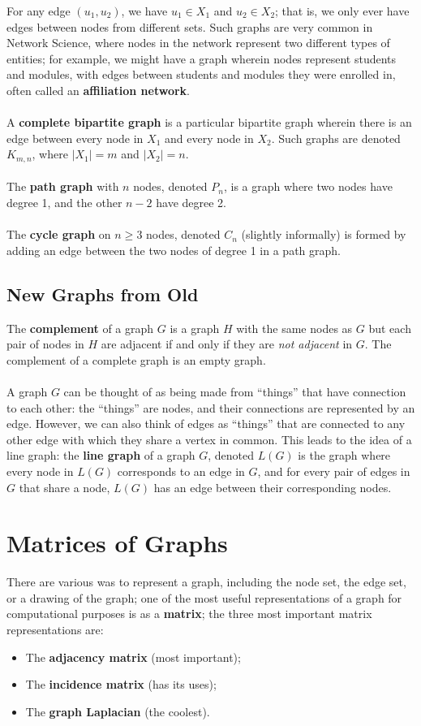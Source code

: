 \documentclass[a4paper,11pt]{article}
\begin{document}
For any edge $(u_1, u_2)$, we have $u_1 \in X_1$ and $u_2 \in X_2$; that is, we only ever have edges between nodes from different sets.
Such graphs are very common in Network Science, where nodes in the network represent two different types of entities; for example, we might have a graph wherein nodes represent students and modules, with edges between students and modules they were enrolled in, often called an \textbf{affiliation network}.
\\\\
A \textbf{complete bipartite graph} is a particular bipartite graph wherein there is an edge between every node in $X_1$ and every node in $X_2$.
Such graphs are denoted $K_{m,n}$, where $|X_1| = m$ and $|X_2|=n$.
\\\\
The \textbf{path graph} with $n$ nodes, denoted $P_n$, is a graph where two nodes have degree 1, and the other $n-2$ have degree 2.
\\\\
The \textbf{cycle graph} on $n \geq 3$ nodes, denoted $C_n$ (slightly informally) is formed by adding an edge between the two nodes of degree 1 in a path graph.

\subsection{New Graphs from Old}
The \textbf{complement} of a graph $G$ is a graph $H$ with the same nodes as $G$ but each pair of nodes in $H$ are adjacent if and only if they are \textit{not adjacent} in $G$.
The complement of a complete graph is an empty graph.
\\\\
A graph $G$ can be thought of as being made from ``things'' that have connection to each other: the ``things'' are nodes, and their connections are represented by an edge.
However, we can also think of edges as ``things'' that are connected to any other edge with which they share a vertex in common.
This leads to the idea of a line graph:
the \textbf{line graph} of a graph $G$, denoted $L(G)$ is the graph where every node in $L(G)$ corresponds to an edge in $G$, and for every pair of edges in $G$ that share a node, $L(G)$ has an edge between their corresponding nodes.

\section{Matrices of Graphs}
There are various was to represent a graph, including the node set, the edge set, or a drawing of the graph;
one of the most useful representations of a graph for computational purposes is as a \textbf{matrix}; the three most important matrix representations are:
\begin{itemize}
    \item   The \textbf{adjacency matrix} (most important);
    \item   The \textbf{incidence matrix} (has its uses);
    \item   The \textbf{graph Laplacian} (the coolest).
\end{itemize}
\end{document}
